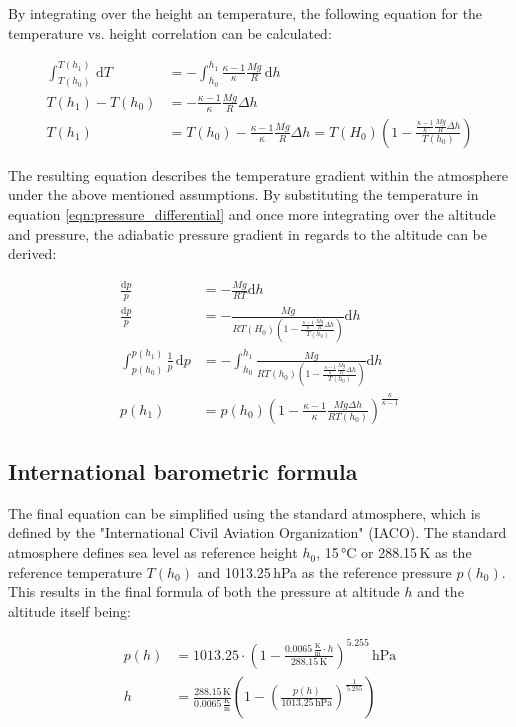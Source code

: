 \documentclass[fontsize=11pt,%
twoside,%
BCOR          = 8mm, %
DIV           = 11,  %
titlepage     = off,%
index=totoc,%
xcolor        = pdftex,%
dvipsnames,%
bibliography  = totoc,%
bibliography = numbered, %
listof        = notnumbered]{scrreprt}
\begin{document}
By integrating over the height an temperature, the following equation for the temperature vs. height correlation can be calculated:

\begin{align}
	\int_{T(h_0)}^{T(h_1)} \,\text{d}T &= - \int_{h_0}^{h_1} \frac{\kappa - 1}{\kappa} \frac{Mg}{R} \,\text{d}h\\
	T(h_1) - T(h_0) &= - \frac{\kappa - 1}{\kappa} \frac{Mg}{R} \Delta h\\
	T(h_1) &= T(h_0) - \frac{\kappa - 1}{\kappa} \frac{Mg}{R} \Delta h = T(H_0)\left(1 - \frac{\frac{\kappa - 1}{\kappa} \frac{Mg}{R} \Delta h}{T(h_0)}\right)
\end{align}

The resulting equation describes the temperature gradient within the atmosphere under the above mentioned assumptions. By substituting the temperature in equation \ref{eqn:pressure_differential} and once more integrating over the altitude and pressure, the adiabatic pressure gradient in regards to the altitude can be derived:

\begin{align}
	\frac{\text{d}p}{p} &= -\frac{Mg}{RT}\text{d}h\\
	\frac{\text{d}p}{p} &= -\frac{Mg}{RT(H_0)\left(1 - \frac{\frac{\kappa - 1}{\kappa} \frac{Mg}{R} \Delta h}{T(h_0)}\right)}\text{d}h\\
	\int_{p(h_0)}^{p(h_1)} \frac{1}{p} \, \text{d}p &= -\int_{h_0}^{h_1} \frac{Mg}{RT(h_0)\left(1 - \frac{\frac{\kappa - 1}{\kappa} \frac{Mg}{R} \Delta h}{T(h_0)}\right)}\text{d}h\\
	p(h_1) &= p(h_0)\left(1 - \frac{\kappa - 1}{\kappa}\frac{Mg\Delta h}{RT(h_0)}\right)^{\frac{\kappa}{\kappa - 1}}
\end{align}

\subsection{International barometric formula}
The final equation can be simplified using the standard atmosphere,  which is defined by the "International Civil Aviation Organization" (IACO). The standard atmosphere defines sea level as reference height $h_0$, 15\,°C or 288.15\,K as the reference temperature $T(h_0)$ and 1013.25\,hPa as the reference pressure $p(h_0)$\cite{StandardAtmosphere}. This results in the final formula of both the pressure at altitude $h$ and the altitude itself being:

\begin{align}
	p(h) &= 1013.25\cdot \left(1 - \frac{0.0065\,\frac{\text{K}}{\text{m}}\cdot h}{288.15\,\text{K}}\right)^{5.255}\,\text{hPa}
	\label{eqn:barometric_formula_pressure}\\
	h &= \frac{288.15\,\text{K}}{0.0065\,\frac{\text{K}}{\text{m}}}\left(1 - \left(\frac{p(h)}{1013.25\,\text{hPa}}\right)^{\frac{1}{5.255}}\right)
	\label{eqn:barometric_formula_altitude}
\end{align}
\end{document}
